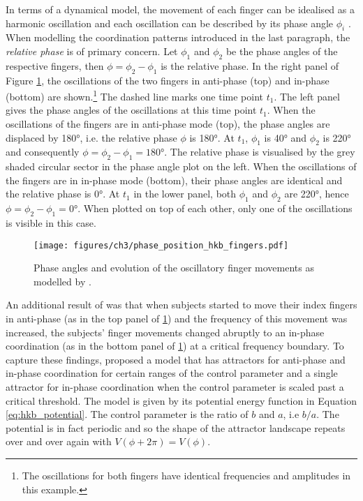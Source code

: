 In terms of a dynamical model, the movement of each finger can be idealised as a harmonic oscillation and each oscillation can be described by its phase angle $\phi_i$ \citep{HakenKelsoBunz1985}. When modelling the coordination patterns introduced in the last paragraph, the \emph{relative phase} is of primary concern. Let $\phi_1$ and $\phi_2$ be the phase angles of the respective fingers, then $\phi = \phi_2 - \phi_1$ is the relative phase. In the right panel of Figure \ref{fig:hkb_phase_position}, the oscillations of the two fingers in anti-phase (top) and in-phase (bottom) are shown.\footnote{The oscillations for both fingers have identical frequencies and amplitudes in this example.} The dashed line marks one time point $t_1$. The left panel gives the phase angles of the oscillations at this time point $t_1$. When the oscillations of the fingers are in anti-phase mode (top), the phase angles are displaced by 180°, i.e. the relative phase $\phi$ is 180°. At $t_1$, $\phi_1$ is 40° and $\phi_2$ is 220° and consequently $\phi=\phi_2-\phi_1=180$°. The relative phase is visualised by the grey shaded circular sector in the phase angle plot on the left. When the oscillations of the fingers are in in-phase mode (bottom), their phase angles are identical and the relative phase is 0°. At $t_1$ in the lower panel, both $\phi_1$ and $\phi_2$ are 220°, hence $\phi = \phi_2 - \phi_1 = 0$°. When plotted on top of each other, only one of the oscillations is visible in this case. 

\begin{figure}[t]
\texttt{[image: figures/ch3/phase\_position\_hkb\_fingers.pdf]}
\caption{Phase angles and evolution of the oscillatory finger movements as modelled by \citet{HakenKelsoBunz1985}.}
\label{fig:hkb_phase_position}
\end{figure}

An additional result of \citet{Kelso1981} was that when subjects started to move their index fingers in anti-phase (as in the top panel of \ref{fig:hkb_phase_position}) and the frequency of this movement was increased, the subjects' finger movements changed abruptly to an in-phase coordination (as in the bottom panel of \ref{fig:hkb_phase_position}) at a critical frequency boundary. To capture these findings, \citet{HakenKelsoBunz1985} proposed a model that has attractors for anti-phase and in-phase coordination for certain ranges of the control parameter and a single attractor for in-phase coordination when the control parameter is scaled past a critical threshold. The model is given by its potential energy function in Equation \ref{eq:hkb_potential}. The control parameter is the ratio of $b$ and $a$, i.e $b/a$. \newpage The potential is in fact periodic and so the shape of the attractor landscape repeats over and over again with $V(\phi + 2\pi) = V(\phi)$. 

